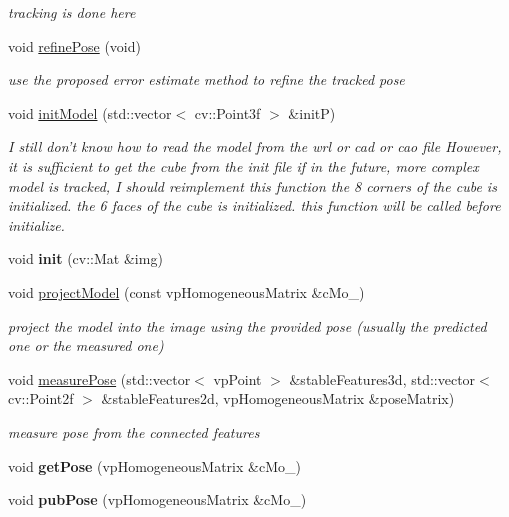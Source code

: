 \begin{DoxyCompactItemize}
\begin{DoxyCompactList}\small\item\em tracking is done here \end{DoxyCompactList}\item 
\hypertarget{classkltFbTracker_a3257d85e4d7c1b3e29d765551fbe7507}{void \hyperlink{classkltFbTracker_a3257d85e4d7c1b3e29d765551fbe7507}{refine\-Pose} (void)}\label{classkltFbTracker_a3257d85e4d7c1b3e29d765551fbe7507}

\begin{DoxyCompactList}\small\item\em use the proposed error estimate method to refine the tracked pose \end{DoxyCompactList}\item 
void \hyperlink{classkltFbTracker_aa830b7fcfceaa9bfccb77c7eab879ff8}{init\-Model} (std\-::vector$<$ cv\-::\-Point3f $>$ \&init\-P)
\begin{DoxyCompactList}\small\item\em \-I still don't know how to read the model from the wrl or cad or cao file \-However, it is sufficient to get the cube from the init file if in the future, more complex model is tracked, \-I should reimplement this function the 8 corners of the cube is initialized. the 6 faces of the cube is initialized. this function will be called before initialize. \end{DoxyCompactList}\item 
\hypertarget{classkltFbTracker_abb7ffa568c30b0f5760fa567abe69505}{void {\bfseries init} (cv\-::\-Mat \&img)}\label{classkltFbTracker_abb7ffa568c30b0f5760fa567abe69505}

\item 
void \hyperlink{classkltFbTracker_af63e4b7bfd2dabdf681a345a08a6a6ce}{project\-Model} (const vp\-Homogeneous\-Matrix \&c\-Mo\-\_\-)
\begin{DoxyCompactList}\small\item\em project the model into the image using the provided pose (usually the predicted one or the measured one) \end{DoxyCompactList}\item 
void \hyperlink{classkltFbTracker_adcddd61877b534e1c03099e18ce61468}{measure\-Pose} (std\-::vector$<$ vp\-Point $>$ \&stable\-Features3d, std\-::vector$<$ cv\-::\-Point2f $>$ \&stable\-Features2d, vp\-Homogeneous\-Matrix \&pose\-Matrix)
\begin{DoxyCompactList}\small\item\em measure pose from the connected features \end{DoxyCompactList}\item 
\hypertarget{classkltFbTracker_a69db4ec71868931e9903ef2011d6608b}{void {\bfseries get\-Pose} (vp\-Homogeneous\-Matrix \&c\-Mo\-\_\-)}\label{classkltFbTracker_a69db4ec71868931e9903ef2011d6608b}

\item 
\hypertarget{classkltFbTracker_a7dee57403e06ddbea9ab2e5129b74c3c}{void {\bfseries pub\-Pose} (vp\-Homogeneous\-Matrix \&c\-Mo\-\_\-)}\label{classkltFbTracker_a7dee57403e06ddbea9ab2e5129b74c3c}

\end{DoxyCompactItemize}
